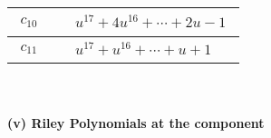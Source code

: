 \documentclass[1p]{elsarticle_modified}
\theoremstyle{definition}
\begin{document}
\begin{tabular}{m{50pt}|m{274pt}}
\hline $$\begin{aligned}c_{10}\end{aligned}$$&$\begin{aligned}
&u^{17}+4 u^{16}+\cdots+2 u-1
\end{aligned}$\\
\hline $$\begin{aligned}c_{11}\end{aligned}$$&$\begin{aligned}
&u^{17}+u^{16}+\cdots+u+1
\end{aligned}$\\
\hline
\end{tabular}\\~\\
\newpage\renewcommand{\arraystretch}{1}
\flushleft \textbf{(v) Riley Polynomials at the component}\newline \\
\end{document}

